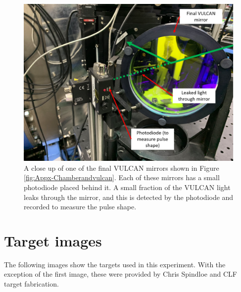 \begin{figure}[ht]
\begin{centering}
\includegraphics[width=1.0\textwidth]{figures/AppendixExperiment/Photodiode.png}%
\caption{\label{fig:Appx-Photodiode} A close up of one of the final VULCAN mirrors shown in Figure \ref{fig:Appx-Chamberandvulcan}. Each  of these mirrors has a small photodiode placed behind it. A small fraction of the VULCAN light leaks through the mirror, and this is detected by the photodiode and recorded to measure the pulse shape.}
\end{centering}
\end{figure}

\section{Target images}

The following images show the targets used in this experiment. With the exception of the first image, these were provided by Chris Spindloe and CLF target fabrication.

